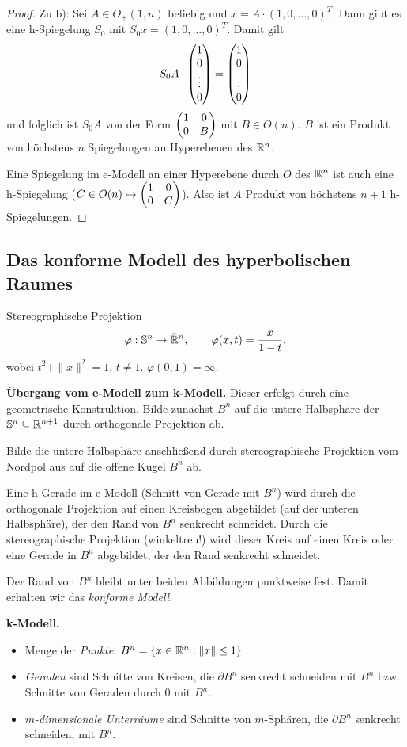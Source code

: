 \begin{proof}
  Zu b): Sei $A \in O_+(1,n)$ beliebig und $x = A \cdot (1,0,\ldots,0)^T$. Dann
  gibt es eine h-Spiegelung $S_0$ mit $S_0 x = (1,0,\ldots,0)^T$. Damit gilt
  \[ S_0 A \cdot \begin{pmatrix}1 \\ 0 \\ \vdots \\ 0\end{pmatrix} = \begin{pmatrix}1 \\ 0 \\ \vdots \\ 0\end{pmatrix} \]
  und folglich ist $S_0 A$ von der Form $\begin{pmatrix}1 & 0 \\ 0 & B\end{pmatrix}$ mit $B \in
  O(n)$. $B$ ist ein Produkt von höchstens $n$ Spiegelungen an Hyperebenen des
  $\mathbb{R}^n$.

  Eine Spiegelung im e-Modell an einer Hyperebene durch $O$ des $\mathbb{R}^n$ ist
  auch eine h-Spiegelung ($C \in O(n) \mapsto \begin{pmatrix}1 & 0 \\ 0 & C\end{pmatrix}$). Also ist
  $A$ Produkt von höchstens $n+1$ h-Spiegelungen.
\end{proof}

\subsection{Das konforme Modell des hyperbolischen Raumes}
Stereographische Projektion
\[ \varphi: \mathbb{S}^n \to \hat{\mathbb{R}}^n, \qquad \varphi(x,t) = \frac{x}{1-t}, \]
wobei $t^2 + \|x\|^2 = 1$, $t \ne 1$. $\varphi(0,1) = \infty$.

\textbf{Übergang vom e-Modell zum k-Modell.} Dieser erfolgt durch eine geometrische
Konstruktion. Bilde zunächst $B^n$ auf die untere Halbsphäre der $\mathbb{S}^n
\subseteq \mathbb{R}^{n+1}$ durch orthogonale Projektion ab.

Bilde die untere Halbsphäre anschließend durch stereographische Projektion vom
Nordpol aus auf die offene Kugel $B^n$ ab.

Eine h-Gerade im e-Modell (Schnitt von Gerade mit $B^n$) wird durch die
orthogonale Projektion auf einen Kreisbogen abgebildet (auf der unteren
Halbsphäre), der den Rand von $B^n$ senkrecht schneidet. Durch die
stereographische Projektion (winkeltreu!) wird dieser Kreis auf einen Kreis oder
eine Gerade in $B^n$ abgebildet, der den Rand senkrecht schneidet.

Der Rand von $B^n$ bleibt unter beiden Abbildungen punktweise fest. Damit
erhalten wir das \emph{konforme Modell}.

\textbf{k-Modell.}
\begin{itemize}
  \item Menge der \emph{Punkte}: $B^n = \{ x \in \mathbb{R}^n : \| x \| \le 1 \}$
  \item \emph{Geraden} sind Schnitte von Kreisen, die $\partial B^n$ senkrecht
    schneiden mit $B^n$ bzw. Schnitte von Geraden durch 0 mit $B^n$.
  \item \emph{$m$-dimensionale Unterräume} sind Schnitte von $m$-Sphären, die
    $\partial B^n$ senkrecht schneiden, mit $B^n$.
\end{itemize}

